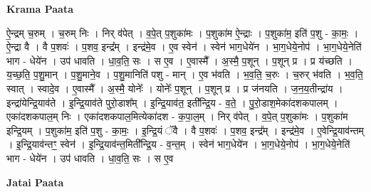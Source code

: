 \documentclass[17pt]{extarticle}
\begin{document}
\textbf{Krama Paata} \newline

ऐ॒न्द्रम् च॒रुम् । च॒रुम् निः । निर् व॑पेत् । व॒पे॒त् प॒शुका॑मः । प॒शुका॑म ऐ॒न्द्राः । प॒शुका॑म॒ इति॑ प॒शु - का॒मः॒ । ऐ॒न्द्रा वै । वै प॒शवः॑ । प॒शव॒ इन्द्र᳚म् । इन्द्र॑मे॒व । ए॒व स्वेन॑ । स्वेन॑ भाग॒धेये॑न । भा॒ग॒धेये॒नोप॑ । भा॒ग॒धेये॒नेति॑ भाग - धेये॑न । उप॑ धावति । धा॒व॒ति॒ सः । स ए॒व । ए॒वास्मै᳚ । अ॒स्मै॒ प॒शून् । प॒शून् प्र । प्र य॑च्छति । य॒च्छ॒ति॒ प॒शु॒मान् । प॒शु॒माने॒व । प॒शु॒मानिति॑ पशु - मान् । ए॒व भ॑वति । भ॒व॒ति॒ च॒रुः । च॒रुर् भ॑वति । भ॒व॒ति॒ स्वात् । स्वादे॒व । ए॒वास्मै᳚ । अ॒स्मै॒ योनेः᳚ । योनेः᳚ प॒शून् । प॒शून् प्र । प्र ज॑नयति । ज॒न॒य॒तीन्द्रा॑य । इन्द्रा॑येन्द्रि॒याव॑ते । इ॒न्द्रि॒याव॑ते पुरो॒डाश᳚म् । इ॒न्द्रि॒याव॑त॒ इती᳚न्द्रि॒य - व॒ते॒ । पु॒रो॒डाश॒मेका॑दशकपालम् । एका॑दशकपाल॒म् निः । एका॑दशकपाल॒मित्येका॑दश - क॒पा॒ल॒म् । निर् व॑पेत् । व॒पे॒त् प॒शुका॑मः । प॒शुका॑म इन्द्रि॒यम् । प॒शुका॑म॒ इति॑ प॒शु - का॒मः॒ । इ॒न्द्रि॒यं ॅवै । वै प॒शवः॑ । प॒शव॒ इन्द्र᳚म् । इन्द्र॑मे॒व । ए॒वेन्द्रि॒याव॑न्तम् । इ॒न्द्रि॒याव॑न्तꣳ॒॒ स्वेन॑ । इ॒न्द्रि॒याव॑न्त॒मिती᳚न्द्रि॒य - व॒न्त॒म् । स्वेन॑ भाग॒धेये॑न । भा॒ग॒धेये॒नोप॑ । भा॒ग॒धेये॒नेति॑ भाग - धेये॑न । उप॑ धावति । धा॒व॒ति॒ सः । स ए॒व \newline

\textbf{Jatai Paata} \newline
\end{document}
